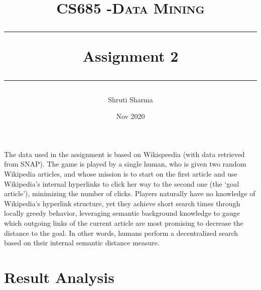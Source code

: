 \documentclass[11pt]{article}
\title{	
	\normalfont\normalsize
	\textsc{CS685 -Data Mining}\linebreak
	\medskip 
	\rule{\linewidth}{0.5pt}\linebreak
	\medskip
	{\huge Assignment 2}
	\medskip 
	\rule{\linewidth}{2pt}
}
\author{Shruti Sharma}
\date{Nov 2020}
\begin{document}
\maketitle
The data used in the assignment is based on Wikispeedia (with data retrieved from SNAP). The game is played by a single human, who is given two random Wikipedia articles, and whose mission is to start on the first article and use Wikipedia’s internal hyperlinks to click her way to the second one (the ‘goal article’), minimizing the number of clicks. Players naturally have no knowledge of Wikipedia’s hyperlink structure, yet they achieve short search times through locally greedy behavior, leveraging semantic background knowledge to gauge which outgoing links of the current article are most promising to decrease the distance to the goal. In other words, humans perform a decentralized search based on their internal semantic distance measure.

\section{Result Analysis}
\end{document}
